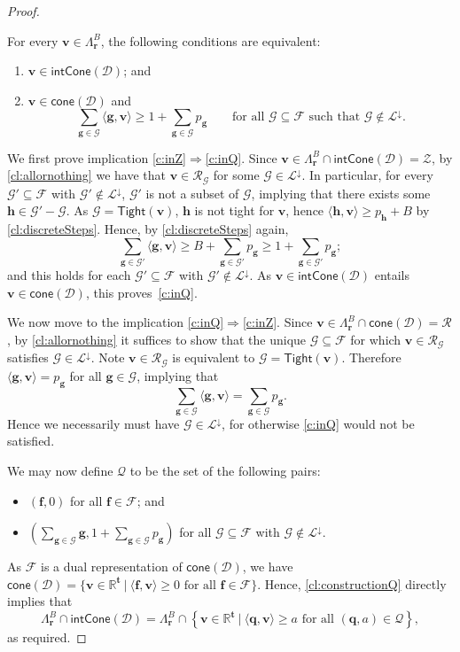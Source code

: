 \documentclass{theoretics}
\renewcommand{\geq}{\geqslant}
\newcommand{\Dd}{\mathcal{D}}
\newcommand{\R}{\mathbb{R}}
\newcommand{\tup}[1]{{\mathbf{#1}}}
\newcommand{\tv}{\tup t}
\newcommand{\ff}{\tup f}
\renewcommand{\gg}{\tup g}
\newcommand{\hh}{\tup h}
\newcommand{\rr}{\tup r}
\newcommand{\qq}{\tup q}
\newcommand{\myvv}{\tup v} %
\newcommand{\Qq}{\mathcal{Q}}
\newcommand{\Ff}{\mathcal{F}}
\newcommand{\Gg}{\mathcal{G}}
\newcommand{\Rr}{\mathcal{R}}
\newcommand{\Zz}{\mathcal{Z}}
\newcommand{\Ss}{\mathscr{L}}
\newcommand{\Tight}{\mathsf{Tight}}
\newcommand{\sca}[2]{\langle #1,#2\rangle}
\renewcommand{\setminus}{-}
\newcommand{\realcone}{\mathsf{cone}}
\newcommand{\intcone}{\mathsf{intCone}}
\begin{document}
\begin{proof}
\begin{techclaim}\label{cl:constructionQ}
 For every $\myvv\in \Lambda_\rr^B$, the following conditions are equivalent:
 \begin{enumerate}[label=(\arabic*),ref=(\arabic*),nosep]
  \item\label{c:inZ} $\myvv\in \intcone(\Dd)$; and
  \item\label{c:inQ} $\myvv\in \realcone(\Dd)$ and
  $$\sum_{\gg\in \Gg} \sca{\gg}{\myvv} \geq 1+\sum_{\gg\in \Gg} p_\gg\qquad\textrm{for all }\Gg\subseteq \Ff\textrm{ such that }\Gg\notin \Ss^\downarrow.$$
 \end{enumerate}
\end{techclaim}
\begin{subproof}
We first prove implication \ref{c:inZ}$\Rightarrow$\ref{c:inQ}. Since $\myvv\in \Lambda_\rr^B\cap \intcone(\Dd)=\Zz$, by \cref{cl:allornothing} we have that $\myvv\in \Rr_\Gg$ for some $\Gg\in \Ss^\downarrow$. In particular, for every $\Gg'\subseteq \Ff$ with $\Gg'\notin \Ss^\downarrow$, $\Gg'$ is not a subset of $\Gg$, implying that there exists some $\hh\in \Gg'\setminus \Gg$. As $\Gg=\Tight(\myvv)$, $\hh$ is not tight for $\myvv$, hence $\sca{\hh}{\myvv}\geq p_\hh+B$ by \cref{cl:discreteSteps}. Hence, by  \cref{cl:discreteSteps} again,
$$\sum_{\gg\in \Gg'} \sca{\gg}{\myvv}\geq B+\sum_{\gg\in \Gg'} p_\gg\geq 1+\sum_{\gg\in \Gg'} p_\gg;$$
and this holds for each $\Gg'\subseteq \Ff$ with $\Gg'\notin \Ss^{\downarrow}$.
As $\myvv\in \intcone(\Dd)$ entails $\myvv\in \realcone(\Dd)$, this proves~\ref{c:inQ}.

We now move to the implication \ref{c:inQ}$\Rightarrow$\ref{c:inZ}. Since $\myvv\in  \Lambda_\rr^B\cap \realcone(\Dd)=\Rr$, by \cref{cl:allornothing} it suffices to show that the unique $\Gg\subseteq \Ff$ for which $\myvv\in \Rr_\Gg$ satisfies $\Gg\in \Ss^\downarrow$. Note $\myvv\in \Rr_\Gg$ is equivalent to $\Gg=\Tight(\myvv)$. Therefore $\sca{\gg}{\myvv}=p_\gg$ for all $\gg\in \Gg$, implying that
$$\sum_{\gg\in \Gg} \sca{\gg}{\myvv} = \sum_{\gg\in \Gg} p_\gg.$$
Hence we necessarily must have $\Gg\in \Ss^\downarrow$, for otherwise \ref{c:inQ} would not be satisfied.
\end{subproof}

We may now define $\Qq$ to be the set of the following pairs:
\begin{itemize}[nosep]
 \item $(\ff,0)$ for all $\ff\in \Ff$; and
 \item $\left(\sum_{\gg\in \Gg} \gg,1+\sum_{\gg\in \Gg} p_\gg\right)$ for all $\Gg\subseteq \Ff$ with $\Gg\notin \Ss^\downarrow.$
\end{itemize}
As $\Ff$ is a dual representation of $\realcone(\Dd)$, we have $\realcone(\Dd)=\{\myvv\in \R^\tv~|~\sca{\ff}{\myvv}\geq 0\textrm{ for all }\ff\in \Ff\}$. Hence, \cref{cl:constructionQ} directly implies that
$$\Lambda_\rr^B\cap \intcone(\Dd)=\Lambda_\rr^B\cap \left\{\myvv\in \R^\tv~|~\sca{\qq}{\myvv}\geq a\textrm{ for all }(\qq,a)\in \Qq\right\},$$
as required.


\end{proof}
\end{document}
